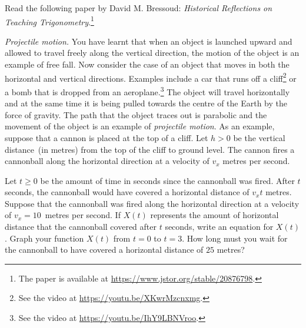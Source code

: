 \documentclass[a4paper,oneside,12pt]{article}
\begin{document}
\begin{problem}
\item Read the following paper by David M. Bressoud:
  \emph{Historical Reflections on Teaching Trigonometry}.\footnote{
    The paper is available at
    \url{https://www.jstor.org/stable/20876798}.
  }

\item\label{prob:trigonometric:cannon_cliff}
  \emph{Projectile motion.}
  You have learnt that when an object is launched upward and allowed
  to travel freely along the vertical direction, the motion of the
  object is an example of free fall.  Now consider the case of an
  object that moves in both the horizontal and vertical directions.
  Examples include a car that runs off a cliff\footnote{
    See the video at
    \url{https://youtu.be/XKwrMzcnxmg}.
  }
  or a bomb that is dropped from an aeroplane.\footnote{
    See the video at
    \url{https://youtu.be/IhY9LBNVroo}.
  }
  The object will travel horizontally and at the same time it is being
  pulled towards the centre of the Earth by the force of gravity.  The
  path that the object traces out is parabolic and the movement of the
  object is an example of \emph{projectile motion}.  As an example,
  suppose that a cannon is placed at the top of a cliff.  Let $h > 0$
  be the vertical distance~(in metres) from the top of the cliff to
  ground level.  The cannon fires a cannonball along the horizontal
  direction at a velocity of $v_x$ metres per second.
  \begin{packedenum}
  \item\label{subprob:trigonometric:cannon_cliff_horizontal_displacement}
    Let $t \geq 0$ be the amount of time in seconds since the
    cannonball was fired.  After $t$ seconds, the cannonball would
    have covered a horizontal distance of $v_xt$ metres.  Suppose that
    the cannonball was fired along the horizontal direction at a
    velocity of $v_x = 10$~metres per second.  If $X(t)$ represents
    the amount of horizontal distance that the cannonball covered
    after $t$ seconds, write an equation for $X(t)$.  Graph your
    function $X(t)$ from $t = 0$ to $t = 3$.  How long must you wait
    for the cannonball to have covered a horizontal distance of $25$
    metres?


\end{packedenum}
\end{problem}
\end{document}
